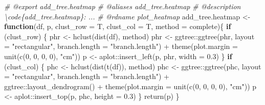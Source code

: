 \documentclass[
]{article}
\newenvironment{Shaded}{\begin{snugshade}}{\end{snugshade}}
\newcommand{\AttributeTok}[1]{\textcolor[rgb]{0.77,0.63,0.00}{#1}}
\newcommand{\CommentTok}[1]{\textcolor[rgb]{0.56,0.35,0.01}{\textit{#1}}}
\newcommand{\ControlFlowTok}[1]{\textcolor[rgb]{0.13,0.29,0.53}{\textbf{#1}}}
\newcommand{\DecValTok}[1]{\textcolor[rgb]{0.00,0.00,0.81}{#1}}
\newcommand{\FloatTok}[1]{\textcolor[rgb]{0.00,0.00,0.81}{#1}}
\newcommand{\FunctionTok}[1]{\textcolor[rgb]{0.00,0.00,0.00}{#1}}
\newcommand{\NormalTok}[1]{#1}
\newcommand{\OtherTok}[1]{\textcolor[rgb]{0.56,0.35,0.01}{#1}}
\newcommand{\SpecialCharTok}[1]{\textcolor[rgb]{0.00,0.00,0.00}{#1}}
\newcommand{\StringTok}[1]{\textcolor[rgb]{0.31,0.60,0.02}{#1}}
\begin{document}
\begin{Shaded}
\begin{Highlighting}[]
\CommentTok{\#\textquotesingle{} @export add\_tree.heatmap}
\CommentTok{\#\textquotesingle{} @aliases add\_tree.heatmap}
\CommentTok{\#\textquotesingle{} @description \textbackslash{}code\{add\_tree.heatmap\}: ...}
\CommentTok{\#\textquotesingle{} @rdname plot\_heatmap}
\NormalTok{add\_tree.heatmap }\OtherTok{\textless{}{-}} 
  \ControlFlowTok{function}\NormalTok{(df, p, }\AttributeTok{clust\_row =}\NormalTok{ T, }\AttributeTok{clust\_col =}\NormalTok{ T, }\AttributeTok{method =} \StringTok{\textquotesingle{}complete\textquotesingle{}}\NormalTok{)\{}
    \ControlFlowTok{if}\NormalTok{ (clust\_row) \{}
\NormalTok{      phr }\OtherTok{\textless{}{-}} \FunctionTok{hclust}\NormalTok{(}\FunctionTok{dist}\NormalTok{(df), method)}
\NormalTok{      phr }\OtherTok{\textless{}{-}}\NormalTok{ ggtree}\SpecialCharTok{::}\FunctionTok{ggtree}\NormalTok{(phr, }\AttributeTok{layout =} \StringTok{"rectangular"}\NormalTok{, }\AttributeTok{branch.length =} \StringTok{"branch.length"}\NormalTok{) }\SpecialCharTok{+}
        \FunctionTok{theme}\NormalTok{(}\AttributeTok{plot.margin =} \FunctionTok{unit}\NormalTok{(}\FunctionTok{c}\NormalTok{(}\DecValTok{0}\NormalTok{, }\DecValTok{0}\NormalTok{, }\DecValTok{0}\NormalTok{, }\DecValTok{0}\NormalTok{), }\StringTok{"cm"}\NormalTok{))}
\NormalTok{      p }\OtherTok{\textless{}{-}}\NormalTok{ aplot}\SpecialCharTok{::}\FunctionTok{insert\_left}\NormalTok{(p, phr, }\AttributeTok{width =} \FloatTok{0.3}\NormalTok{)}
\NormalTok{    \}}
    \ControlFlowTok{if}\NormalTok{ (clust\_col) \{}
\NormalTok{      phc }\OtherTok{\textless{}{-}} \FunctionTok{hclust}\NormalTok{(}\FunctionTok{dist}\NormalTok{(}\FunctionTok{t}\NormalTok{(df)), method)}
\NormalTok{      phc }\OtherTok{\textless{}{-}}\NormalTok{ ggtree}\SpecialCharTok{::}\FunctionTok{ggtree}\NormalTok{(phc, }\AttributeTok{layout =} \StringTok{"rectangular"}\NormalTok{, }\AttributeTok{branch.length =} \StringTok{"branch.length"}\NormalTok{) }\SpecialCharTok{+}
\NormalTok{        ggtree}\SpecialCharTok{::}\FunctionTok{layout\_dendrogram}\NormalTok{() }\SpecialCharTok{+}
        \FunctionTok{theme}\NormalTok{(}\AttributeTok{plot.margin =} \FunctionTok{unit}\NormalTok{(}\FunctionTok{c}\NormalTok{(}\DecValTok{0}\NormalTok{, }\DecValTok{0}\NormalTok{, }\DecValTok{0}\NormalTok{, }\DecValTok{0}\NormalTok{), }\StringTok{"cm"}\NormalTok{))}
\NormalTok{      p }\OtherTok{\textless{}{-}}\NormalTok{ aplot}\SpecialCharTok{::}\FunctionTok{insert\_top}\NormalTok{(p, phc, }\AttributeTok{height =} \FloatTok{0.3}\NormalTok{)}
\NormalTok{    \}}
    \FunctionTok{return}\NormalTok{(p)}
\NormalTok{  \}}


\end{Highlighting}
\end{Shaded}
\end{document}
